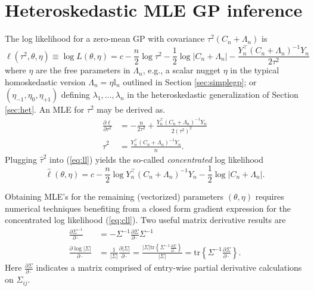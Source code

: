 \documentclass[12pt]{article}
\begin{document}
\section{Heteroskedastic MLE GP inference}
\label{sec:hetmle}

The log likelihood for a zero-mean GP with covariance $\tau^2 (C_n + \Lambda_n)$ is
\begin{equation}
\ell(\tau^2, \theta, \eta) \equiv \log L(\theta, \eta) = c 
- \frac{n}{2} \log \tau^2 - \frac{1}{2} \log | C_n + \Lambda_n | 
- \frac{Y_n^\top (C_n + \Lambda_n)^{-1} Y_n}{2 \tau^2}
\label{eq:ll}
\end{equation}
where $\eta$ are the free parameters in $\Lambda_n$, e.g., a scalar
nugget $\eta$ in the typical homoskedastic version $\Lambda_n = \eta
\mathbb{I}_n$ outlined in Section \ref{sec:simplegp}; or $(\eta_{-1}, \eta_0,
\eta_{+1})$ defining $\lambda_1, \dots, \lambda_n$ in the heteroskedastic
generalization of Section \ref{sec:het}.  An MLE for $\tau^2$ may be derived as.
\begin{align}
\frac{\partial \ell}{\partial \tau^2} &= - \frac{n}{2 \tau^2} 
+ \frac{Y_n^\top(C_n + \Lambda_n)^{-1} Y_n}{2 (\tau^2)^2} \nonumber \\
\hat{\tau}^2 &= \frac{Y_n^\top(C_n + \Lambda_n)^{-1} Y_n}{n} \label{eq:tau2hat}.
\end{align}
Plugging $\hat{\tau}^2$ into (\ref{eq:ll}) yields the so-called {\em
concentrated} log likelihood
\begin{equation}
\hat{\ell}(\theta, \eta) = c - \frac{n}{2} \log Y_n^\top(C_n + \Lambda_n)^{-1} Y_n
 - \frac{1}{2} \log | C_n + \Lambda_n |.
\label{eq:cll}
\end{equation}

Obtaining MLE's for the remaining (vectorized) parameters $(\theta, \eta)$
requires numerical techniques benefiting from a closed form gradient expression
for the concentrated log likelihood (\ref{eq:cll}).  Two useful matrix
derivative results are
\begin{align*}
\frac{\partial \Sigma^{-1}}{\partial \cdot} &= - \Sigma^{-1} \frac{\partial \Sigma}{\partial \cdot} \Sigma^{-1} \\
\frac{\partial \log | \Sigma|}{\partial \cdot} &= \frac{1}{|\Sigma|} \frac{\partial |\Sigma|}{\partial \cdot} = 
\frac{| \Sigma| \mathrm{tr}\left\{\Sigma^{-1} \frac{\partial \Sigma}{\partial \cdot} \right\}}{|\Sigma|} = 
\mathrm{tr}\left\{\Sigma^{-1} \frac{\partial \Sigma}{\partial \cdot} \right\}.
\end{align*}
Here $\frac{\partial \Sigma}{\partial \cdot}$ indicates a matrix
comprised of entry-wise partial derivative calculations on $\Sigma_{ij}$.
\end{document}
